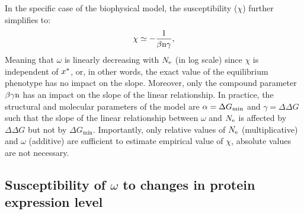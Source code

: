 In the specific case of the biophysical model, the susceptibility ($\chi$) further simplifies to:
\begin{gather}
 \chi \simeq -\dfrac{1}{\beta \Nsite \gamma}, \label{eq:chi_application}
\end{gather}
Meaning that $\omega$ is linearly decreasing with $N_{\mathrm{e}}$ (in log scale) since $\chi$ is independent of $x^{*}$, or, in other words, the exact value of the equilibrium phenotype has no impact on the slope.
Moreover, only the compound parameter $\beta \gamma \text{n}$ has an impact on the slope of the linear relationship.
In practice, the structural and molecular parameters of the model are $\alpha = \Delta G_{\text{min}}$ and $\gamma = \Delta \Delta G$ such that the slope of the linear relationship between $\omega$ and $N_{\mathrm{e}}$ is affected by $\Delta \Delta G$ but not by $\Delta G_{\text{min}}$.
Importantly, only relative values of $N_{\mathrm{e}}$ (multiplicative) and $\omega$ (additive) are sufficient to estimate empirical value of $\chi$, absolute values are not necessary.
\subsection{Susceptibility of \texorpdfstring{$\omega$}{ω} to changes in protein expression level}

\label{sec:expression}

